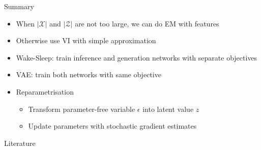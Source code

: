 \documentclass[14pt]{beamer}
\begin{document}
\begin{frame}{Summary}
\begin{itemize}
\item When $ |\mathcal{X}| $ and $ |\mathcal{Z}| $ are not too large, we can do EM with features
\item Otherwise use VI with simple approximation
\item Wake-Sleep: train inference and generation networks with separate objectives
\item VAE: train both networks with same objective
\item Reparametrisation
\begin{itemize}
\item  Transform parameter-free variable $ \epsilon $ into latent value $ z $
\item Update parameters with stochastic gradient estimates
\end{itemize}
\end{itemize}
\end{frame}

\begin{frame}[allowframebreaks]{Literature}
\nocite{KingmaWelling:2013}
\nocite{HintonEtAl:1995}
\nocite{RezendeEtAl:2014}
\nocite{TitsiasLazarogredilla:2014}
\nocite{BergkirkpatrickEtAl:2010}
\nocite{KucukelbirEtAl:2017}



\end{frame}
\end{document}
